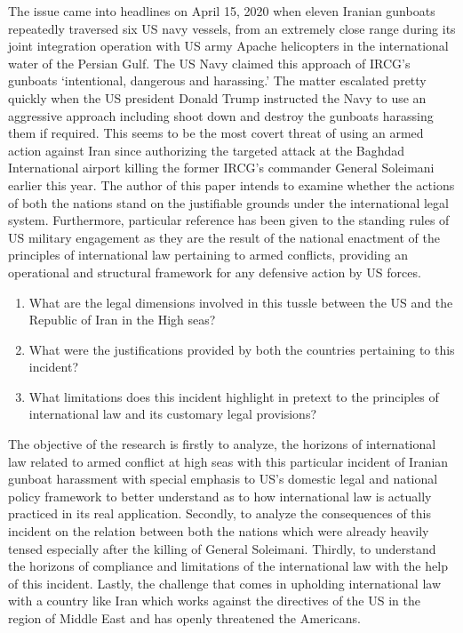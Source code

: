 \begin{multicols}{2}
\noi
The issue came into headlines on April 15, 2020 when eleven Iranian gunboats repeatedly
traversed six US navy vessels, from an extremely close range during its joint integration
operation with US army Apache helicopters in the international water of the Persian Gulf.
The US Navy claimed this approach of IRCG’s gunboats ‘intentional, dangerous and
harassing.’ The matter escalated pretty quickly when the US president Donald Trump
instructed the Navy to use an aggressive approach including shoot down and destroy the
gunboats harassing them if required. This seems to be the most covert threat of using an
armed action against Iran since authorizing the targeted attack at the Baghdad International
 airport killing the former IRCG’s commander General Soleimani earlier this year. The
author of this paper intends to examine whether the actions of both the nations stand on the
justifiable grounds under the international legal system. Furthermore, particular reference
has been given to the standing rules of US military engagement as they are the result of the
national enactment of the principles of international law pertaining to armed conflicts,
providing an operational and structural framework for any defensive action by US forces.

\begin{enumerate}[label=$\alph*)$]
\item What are the legal dimensions involved in this tussle between the US and the
Republic of Iran in the High seas?

\item  What were the justifications provided by both the countries pertaining to this incident?

\item What limitations does this incident highlight in pretext to the principles of
international law and its customary legal provisions? 
\end{enumerate}


\noi
The objective of the research is firstly to analyze, the horizons of international law related to
armed conflict at high seas with this particular incident of Iranian gunboat harassment with
special emphasis to US’s domestic legal and national policy framework to better understand
as to how international law is actually practiced in its real application. Secondly, to analyze
the consequences of this incident on the relation between both the nations which were
already heavily tensed especially after the killing of General Soleimani. Thirdly, to
understand the horizons of compliance and limitations of the international law with the help
of this incident. Lastly, the challenge that comes in upholding international law with a
country like Iran which works against the directives of the US in the region of Middle East
and has openly threatened the Americans.


\end{multicols}
